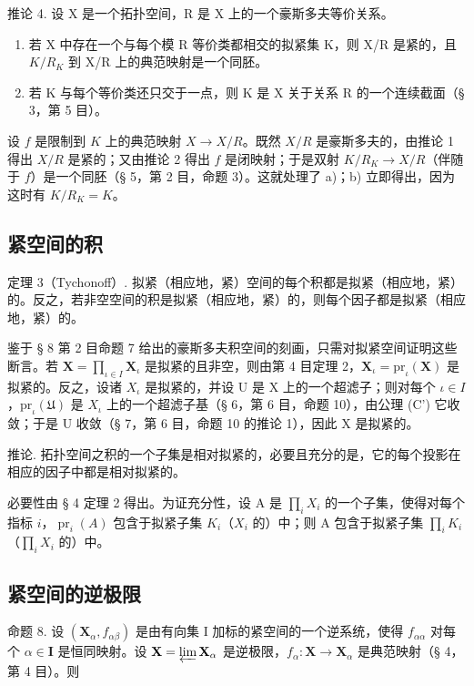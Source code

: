 推论 4. 设 X 是一个拓扑空间，R 是 X 上的一个豪斯多夫等价关系。

\begin{enumerate}
\def\labelenumi{\alph{enumi})}
\item
  若 X 中存在一个与每个模 R 等价类都相交的拟紧集 K，则 X/R 是紧的，且 \(K/R_{K}\) 到 X/R 上的典范映射是一个同胚。
\item
  若 K 与每个等价类还只交于一点，则 K 是 X 关于关系 R 的一个连续截面（§ 3，第 5 目）。
\end{enumerate}

设 \(f\) 是限制到 \(K\) 上的典范映射 \(X \to X / R\)。既然 \(X / R\) 是豪斯多夫的，由推论 1 得出 \(X / R\) 是紧的；又由推论 2 得出 \(f\) 是闭映射；于是双射 \(K / R_K \to X / R\)（伴随于 \(f\)）是一个同胚（§ 5，第 2 目，命题 3）。这就处理了 a)；b) 立即得出，因为这时有 \(K / R_K = K\)。

\subsection{紧空间的积}

定理 3（Tychonoff）. 拟紧（相应地，紧）空间的每个积都是拟紧（相应地，紧）的。反之，若非空空间的积是拟紧（相应地，紧）的，则每个因子都是拟紧（相应地，紧）的。

鉴于 § 8 第 2 目命题 7 给出的豪斯多夫积空间的刻画，只需对拟紧空间证明这些断言。若 \(\mathbf{X} = \prod_{\iota \in I} \mathbf{X}_{\iota}\) 是拟紧的且非空，则由第 4 目定理 2，\(\mathbf{X}_{\iota}=\mathrm{pr}_{\iota}(\mathbf{X})\) 是拟紧的。反之，设诸 \(X_{\iota}\) 是拟紧的，并设 U 是 X 上的一个超滤子；则对每个 \(\iota\in I\)，\(\mathrm{pr}_{\iota}(\mathfrak{U})\) 是 \(X_{\iota}\) 上的一个超滤子基（§ 6，第 6 目，命题 10），由公理 (C') 它收敛；于是 U 收敛（§ 7，第 6 目，命题 10 的推论 1），因此 X 是拟紧的。

推论. 拓扑空间之积的一个子集是相对拟紧的，必要且充分的是，它的每个投影在相应的因子中都是相对拟紧的。

必要性由 § 4 定理 2 得出。为证充分性，设 A 是 \(\prod_{i} X_{i}\) 的一个子集，使得对每个指标 \(i\)，\(\operatorname{pr}_{i}(A)\) 包含于拟紧子集 \(K_{i}\)（\(X_{i}\) 的）中；则 A 包含于拟紧子集 \(\prod_{i} K_{i}\)（\(\prod_{i} X_{i}\) 的）中。

\subsection{紧空间的逆极限}

命题 8. 设 \((\mathbf{X}_{\alpha}, f_{\alpha \beta})\) 是由有向集 I 加标的紧空间的一个逆系统，使得 \(f_{\alpha \alpha}\) 对每个 \(\alpha \in \mathbf{I}\) 是恒同映射。设 \(\mathbf{X} = \varprojlim \mathbf{X}_{\alpha}\) 是逆极限，\(f_{\alpha}: \mathbf{X} \to \mathbf{X}_{\alpha}\) 是典范映射（§ 4，第 4 目）。则

